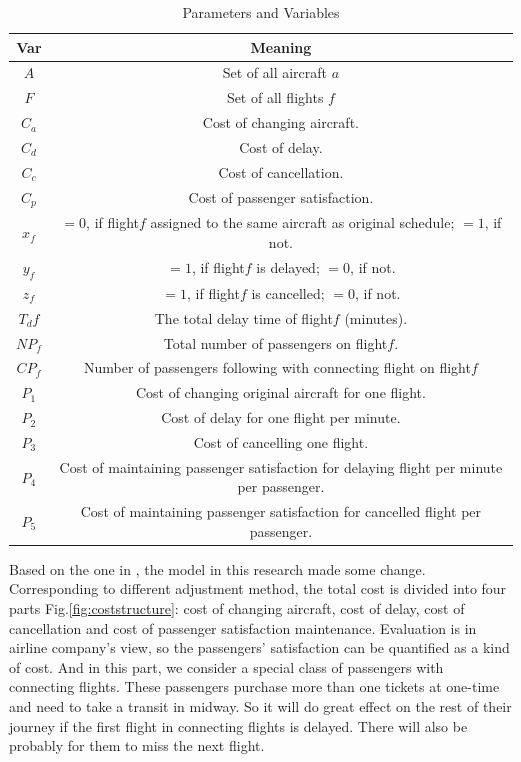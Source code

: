 \documentclass[senior]{IPSstyle}
\begin{document}
\begin{table}
\renewcommand{\arraystretch}{1.0}
\label{piriform_dataset}
\begin{center}
\begin{tabular}{|c|c|}
\hline
\multicolumn{1}{|c|}{Var}
&\multicolumn{1}{c|}{Meaning}
\\
\hline
\(A\)	&	Set of all aircraft \(a\)
\\	\hline
\(F\)	&	Set of all flights \(f\)
\\	\hline
\(C_a\) &   Cost of changing aircraft.
\\  \hline
\(C_d\) &   Cost of delay.
\\  \hline
\(C_c\) &   Cost of cancellation.
\\  \hline
\(C_p\) &   Cost of passenger satisfaction.
\\  \hline
\(x_f\)	&   \(=0\), if flight\(f\) assigned to the same aircraft as original schedule; \(=1\), if not.
\\	\hline
\(y_f\) &   \(=1\), if flight\(f\) is delayed; \(=0\), if not.
\\  \hline
\(z_f\) &   \(=1\), if flight\(f\) is cancelled; \(=0\), if not.
\\  \hline
\(T_df\) &   The total delay time of flight\(f\) (minutes).
\\  \hline
\(NP_f\) &  Total number of passengers on flight\(f\).
\\  \hline
\(CP_f\) &   Number of passengers following with connecting flight on flight\(f\)
\\  \hline
\(P_1\) &   Cost of changing original aircraft for one flight.
\\  \hline
\(P_2\) &   Cost of delay for one flight per minute.
\\  \hline
\(P_3\) &   Cost of cancelling one flight.
\\  \hline
\(P_4\) &   Cost of maintaining passenger satisfaction for delaying flight per minute per passenger.
\\  \hline
\(P_5\) &   Cost of  maintaining passenger satisfaction for cancelled flight per passenger.
\\  \hline
\end{tabular}
\caption{Parameters and Variables}
\end{center}
\end{table}

Based on the one in \cite{sousa2015airline}, the model in this research made some change. Corresponding to different adjustment method, the total cost is divided into four parts Fig.\ref{fig:coststructure}: cost of changing aircraft, cost of delay, cost of cancellation and cost of passenger satisfaction maintenance. Evaluation is in airline company’s view, so the passengers’ satisfaction can be quantified as a kind of cost. And in this part, we consider a special class of passengers with connecting flights. These passengers purchase more than one tickets at one-time and need to take a transit in midway. So it will do great effect on the rest of their journey if the first flight in connecting flights is delayed. There will also be probably for them to miss the next flight. 
\end{document}
